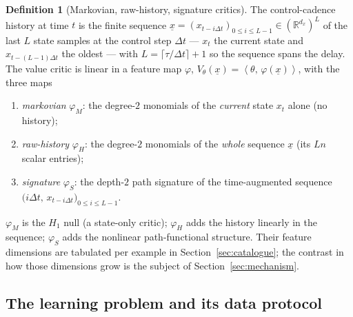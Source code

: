 \documentclass[11pt]{article}
\renewcommand{\_}{\discretionary{\textunderscore}{}{\textunderscore}}
\theoremstyle{plain}
\theoremstyle{definition}
\newtheorem{definition}[theorem]{Definition}
\newcommand{\R}{\mathbb{R}}
\newcommand{\inner}[2]{\left\langle #1,\, #2 \right\rangle}
\begin{document}
\begin{definition}[Markovian, raw-history, signature critics]\label{def:reps}
The control-cadence history at time $t$ is the finite sequence
$\underline x=(x_{t-i\Delta t})_{0\le i\le L-1}\in(\R^{d_x})^{L}$ of the last $L$ state samples at the
control step $\Delta t$ --- $x_{t}$ the current state and $x_{t-(L-1)\Delta t}$ the oldest --- with
$L=\lceil\tau/\Delta t\rceil+1$ so the sequence spans the delay. The value critic is linear in a
feature map $\varphi$, $V_{\theta}(\underline x)=\inner{\theta}{\varphi(\underline x)}$, with the three maps
\begin{enumerate}
\item \emph{markovian} $\varphi_{M}$: the degree-$2$ monomials of the \emph{current} state $x_{t}$
alone (no history);
\item \emph{raw-history} $\varphi_{H}$: the degree-$2$ monomials of the \emph{whole} sequence
$\underline x$ (its $Ln$ scalar entries);
\item \emph{signature} $\varphi_{S}$: the depth-$2$ path signature of the time-augmented sequence
$\big(i\Delta t,\,x_{t-i\Delta t}\big)_{0\le i\le L-1}$.
\end{enumerate}
$\varphi_{M}$ is the $H_1$ null (a state-only critic); $\varphi_{H}$ adds the history linearly in the
sequence; $\varphi_{S}$ adds the nonlinear path-functional structure. Their feature dimensions are
tabulated per example in Section~\ref{sec:catalogue}; the contrast in how those dimensions grow is
the subject of Section~\ref{sec:mechanism}.
\end{definition}

\subsection{The learning problem and its data protocol}\label{sec:data}
\end{document}
